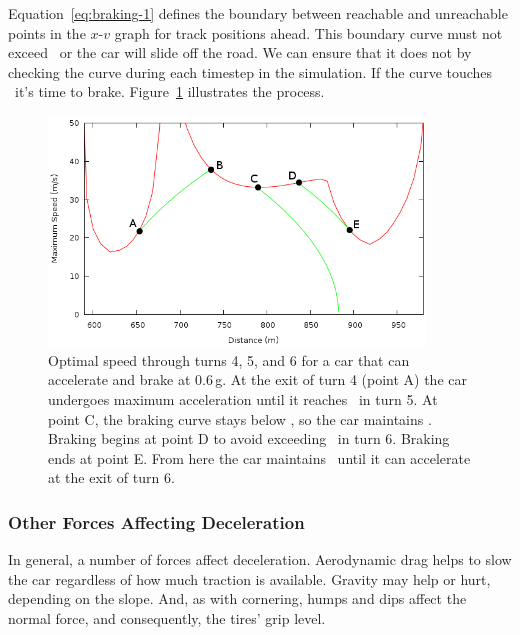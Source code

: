\documentclass{article}
\begin{document}
Equation~\ref{eq:braking-1} defines the boundary between reachable and
unreachable points in the $x$-$v$ graph for track positions ahead.  This
boundary curve must not exceed \vmax\ or the car will slide off the road.  We
can ensure that it does not by checking the curve during each timestep in the
simulation.  If the curve touches \vmax\ it's time to brake.
Figure~\ref{fig:braking-1} illustrates the process.
\begin{figure}
  \centering
  \includegraphics[width=10cm]{braking.png}  
  \caption{Optimal speed through turns 4, 5, and 6 for a car that can accelerate
    and brake at 0.6\,g.  At the exit of turn 4 (point A) the car undergoes
    maximum acceleration until it reaches \vmax\ in turn 5.  At point C, the
    braking curve stays below \vmax, so the car maintains \vmax.  Braking begins
    at point D to avoid exceeding \vmax\ in turn 6.  Braking ends at point E.
    From here the car maintains \vmax\ until it can accelerate at the exit of
    turn 6.}
  \label{fig:braking-1}
\end{figure}

\subsubsection{Other Forces Affecting Deceleration}
In general, a number of forces affect deceleration.  Aerodynamic drag helps to
slow the car regardless of how much traction is available.  Gravity may help or
hurt, depending on the slope.  And, as with cornering, humps and dips affect the
normal force, and consequently, the tires' grip level.
\end{document}
